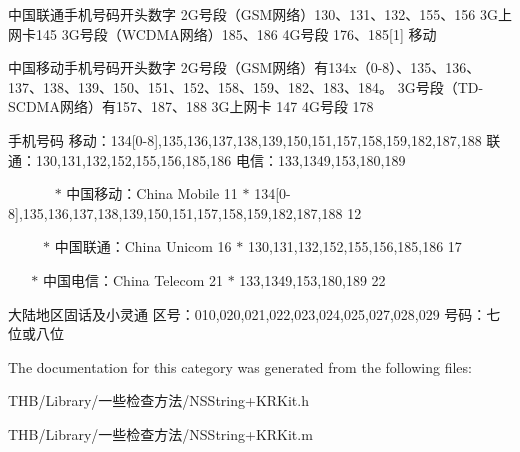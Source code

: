 中国联通手机号码开头数字 2\+G号段（\+G\+S\+M网络）130、131、132、155、156 3\+G上网卡145 3\+G号段（\+W\+C\+D\+M\+A网络）185、186 4\+G号段 176、185\mbox{[}1\mbox{]} 移动

中国移动手机号码开头数字 2\+G号段（\+G\+S\+M网络）有134x（0-\/8）、135、136、137、138、139、150、151、152、158、159、182、183、184。 3\+G号段（\+T\+D-\/\+S\+C\+D\+M\+A网络）有157、187、188 3\+G上网卡 147 4\+G号段 178

手机号码 移动：134\mbox{[}0-\/8\mbox{]},135,136,137,138,139,150,151,157,158,159,182,187,188 联通：130,131,132,152,155,156,185,186 电信：133,1349,153,180,189

~\newline
~\newline
~\newline
~ $\ast$ 中国移动：\+China Mobile 11 $\ast$ 134\mbox{[}0-\/8\mbox{]},135,136,137,138,139,150,151,157,158,159,182,187,188 12 ~\newline
~\newline
~\newline


~\newline
~\newline
~ $\ast$ 中国联通：\+China Unicom 16 $\ast$ 130,131,132,152,155,156,185,186 17 ~\newline
~\newline


~\newline
~ $\ast$ 中国电信：\+China Telecom 21 $\ast$ 133,1349,153,180,189 22 ~\newline


大陆地区固话及小灵通 区号：010,020,021,022,023,024,025,027,028,029 号码：七位或八位

The documentation for this category was generated from the following files\+:\begin{DoxyCompactItemize}
\item 
T\+H\+B/\+Library/一些检查方法/N\+S\+String+\+K\+R\+Kit.\+h\item 
T\+H\+B/\+Library/一些检查方法/N\+S\+String+\+K\+R\+Kit.\+m\end{DoxyCompactItemize}
